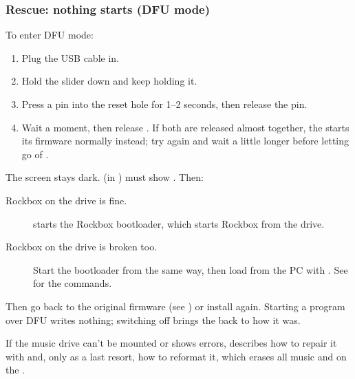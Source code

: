 \subsubsection{\label{ref:yps3_rescue}Rescue: nothing starts (DFU mode)}
To enter DFU mode:
\begin{enumerate}
  \item Plug the USB cable in.
  \item Hold the \ButtonPower{} slider down and keep holding it.
  \item Press a pin into the reset hole for 1--2 seconds, then release the pin.
  \item Wait a moment, then release \ButtonPower{}. If both are released
    almost together, the \dap{} starts its firmware normally instead; try
    again and wait a little longer before letting go of \ButtonPower{}.
\end{enumerate}
The screen stays dark.  (in )
must show . Then:
\begin{description}
  \item[Rockbox on the drive is fine.]
     starts the Rockbox
    bootloader, which starts Rockbox from the drive.
  \item[Rockbox on the drive is broken too.] Start the bootloader from
     the same way, then load 
    from the PC with . See
     for the commands.
\end{description}
Then go back to the original firmware (see ) or
install again. Starting a program over DFU writes nothing; switching off
brings the \dap{} back to how it was.

If the music drive can't be mounted or shows errors, 
describes how to repair it with  and, only as a last resort,
how to reformat it, which erases all music and  on the
\dap{}.
